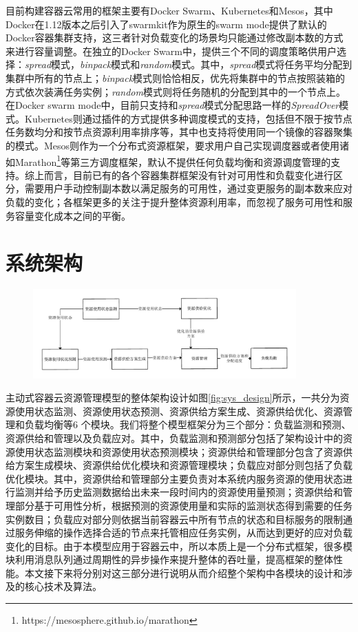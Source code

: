 目前构建容器云常用的框架主要有Docker Swarm、Kubernetes和Mesos，其中Docker在1.12版本之后引入了swarmkit作为原生的swarm mode提供了默认的Docker容器集群支持，这三者针对负载变化的场景均只能通过修改副本数的方式来进行容量调整。在独立的Docker Swarm中，提供三个不同的调度策略供用户选择：\emph{spread}模式，\emph{binpack}模式和\emph{random}模式。其中，\emph{spread}模式将任务平均分配到集群中所有的节点上；\emph{binpack}模式则恰恰相反，优先将集群中的节点按照装箱的方式依次装满任务实例；\emph{random}模式则将任务随机的分配到其中的一个节点上。在Docker swarm mode中，目前只支持和\emph{spread}模式分配思路一样的\emph{SpreadOver}模式。Kubernetes则通过插件的方式提供多种调度模式的支持，包括但不限于按节点任务数均分和按节点资源利用率排序等，其中也支持将使用同一个镜像的容器聚集的模式。Mesos则作为一个分布式资源框架，要求用户自己实现调度器或者使用诸如Marathon\footnote{https://mesosphere.github.io/marathon}等第三方调度框架，默认不提供任何负载均衡和资源调度管理的支持。综上而言，目前已有的各个容器集群框架没有针对可用性和负载变化进行区分，需要用户手动控制副本数以满足服务的可用性，通过变更服务的副本数来应对负载的变化；各框架更多的关注于提升整体资源利用率，而忽视了服务可用性和服务容量变化成本之间的平衡。

\section{系统架构}
\begin{figure}[H]
\centering
\includegraphics[width=0.9\textwidth]{./figure/sys_design}
\end{figure}

主动式容器云资源管理模型的整体架构设计如图\ref{fig:sys_design}所示，一共分为资源使用状态监测、资源使用状态预测、资源供给方案生成、资源供给优化、资源管理和负载均衡等6 个模块。我们将整个模型框架分为三个部分：负载监测和预测、资源供给和管理以及负载应对。其中，负载监测和预测部分包括了架构设计中的资源使用状态监测模块和资源使用状态预测模块；资源供给和管理部分包含了资源供给方案生成模块、资源供给优化模块和资源管理模块；负载应对部分则包括了负载优化模块。其中，资源供给和管理部分主要负责对本系统内服务资源的使用状态进行监测并给予历史监测数据给出未来一段时间内的资源使用量预测；资源供给和管理部分基于可用性分析，根据预测的资源使用量和实际的监测状态得到需要的任务实例数目；负载应对部分则依据当前容器云中所有节点的状态和目标服务的限制通过服务伸缩的操作选择合适的节点来托管相应任务实例，从而达到更好的应对负载变化的目标。由于本模型应用于容器云中，所以本质上是一个分布式框架，很多模块利用消息队列通过周期性的异步操作来提升整体的吞吐量，提高框架的整体性能。本文接下来将分别对这三部分进行说明从而介绍整个架构中各模块的设计和涉及的核心技术及算法。

